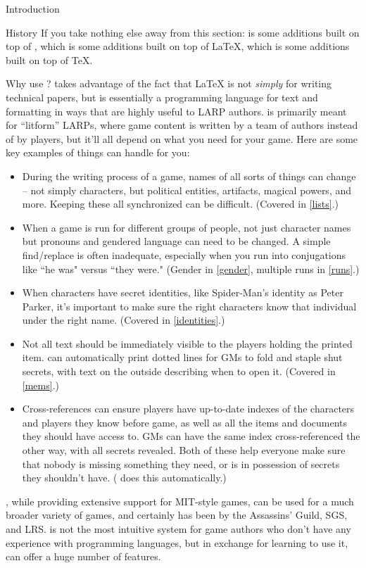 \documentclass[sheet]{GameTexBase}
\begin{document}
\begin{section}{Introduction}
\begin{subsection}{History}
If you take nothing else away from this section: \lrstex{} is some additions built on top of \gametex{}, which is some additions built on top of \LaTeX{}, which is some additions built on top of \TeX{}.
\end{subsection}
\begin{subsection}{Why use \gametex{}?}
\gametex{} takes advantage of the fact that \LaTeX{} is not \textit{simply} for writing technical papers, but is essentially a programming language for text and formatting in ways that are highly useful to LARP authors.
\gametex{} is primarily meant for ``litform'' LARPs, where game content is written by a team of authors instead of by players, but it'll all depend on what you need for your game.
Here are some key examples of things \gametex{} can handle for you:
\begin{itemize}
    \item During the writing process of a game, names of all sorts of things can change – not simply characters, but political entities, artifacts, magical powers, and more.  Keeping these all synchronized can be difficult.  (Covered in \ref{lists}.)
    \item When a game is run for different groups of people, not just character names but pronouns and gendered language can need to be changed.  A simple find/replace is often inadequate, especially when you run into conjugations like ``he was" versus ``they were."  (Gender in \ref{gender}, multiple runs in \ref{runs}.)
		\item When characters have secret identities, like Spider-Man's identity as Peter Parker, it's important to make sure the right characters know that individual under the right name.  (Covered in \ref{identities}.)
    \item Not all text should be immediately visible to the players holding the printed item.  \gametex{} can automatically print dotted lines for GMs to fold and staple shut secrets, with text on the outside describing when to open it.  (Covered in \ref{mems}.)
    \item Cross-references can ensure players have up-to-date indexes of the characters and players they know before game, as well as all the items and documents they should have access to.  GMs can have the same index cross-referenced the other way, with all secrets revealed.  Both of these help everyone make sure that nobody is missing something they need, or is in possession of secrets they shouldn't have.  (\gametex{} does this automatically.)
\end{itemize}
\gametex{}, while providing extensive support for MIT-style games, can be used for a much broader variety of games, and certainly has been by the Assassins' Guild, SGS, and LRS.  
\gametex{} is not the most intuitive system for game authors who don't have any experience with programming languages, but in exchange for learning to use it, \gametex{} can offer a huge number of features.


\end{subsection}
\end{section}
\end{document}
